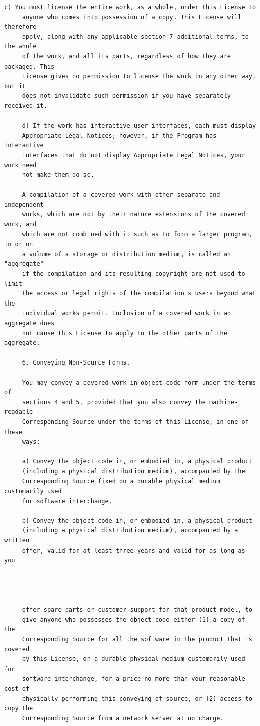 \begin{lstlisting}[basicstyle=\ttfamily\footnotesize,breaklines=true]
     c) You must license the entire work, as a whole, under this License to
     anyone who comes into possession of a copy. This License will therefore
     apply, along with any applicable section 7 additional terms, to the whole
     of the work, and all its parts, regardless of how they are packaged. This
     License gives no permission to license the work in any other way, but it
     does not invalidate such permission if you have separately received it.

     d) If the work has interactive user interfaces, each must display
     Appropriate Legal Notices; however, if the Program has interactive
     interfaces that do not display Appropriate Legal Notices, your work need
     not make them do so.

     A compilation of a covered work with other separate and independent
     works, which are not by their nature extensions of the covered work, and
     which are not combined with it such as to form a larger program, in or on
     a volume of a storage or distribution medium, is called an "aggregate"
     if the compilation and its resulting copyright are not used to limit
     the access or legal rights of the compilation's users beyond what the
     individual works permit. Inclusion of a covered work in an aggregate does
     not cause this License to apply to the other parts of the aggregate.

     6. Conveying Non-Source Forms.

     You may convey a covered work in object code form under the terms of
     sections 4 and 5, provided that you also convey the machine-readable
     Corresponding Source under the terms of this License, in one of these
     ways:

     a) Convey the object code in, or embodied in, a physical product
     (including a physical distribution medium), accompanied by the
     Corresponding Source fixed on a durable physical medium customarily used
     for software interchange.

     b) Convey the object code in, or embodied in, a physical product
     (including a physical distribution medium), accompanied by a written
     offer, valid for at least three years and valid for as long as you




     offer spare parts or customer support for that product model, to
     give anyone who possesses the object code either (1) a copy of the
     Corresponding Source for all the software in the product that is covered
     by this License, on a durable physical medium customarily used for
     software interchange, for a price no more than your reasonable cost of
     physically performing this conveying of source, or (2) access to copy the
     Corresponding Source from a network server at no charge.


\end{lstlisting}

